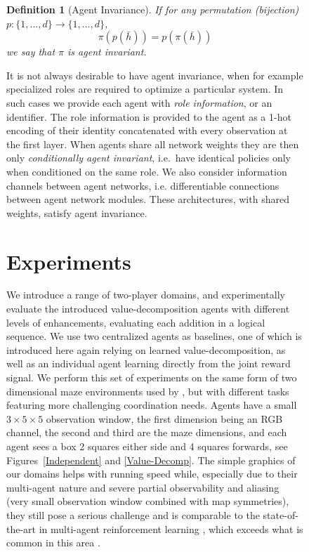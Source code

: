 \documentclass{article}
\newtheorem{definition}{Definition}
\begin{document}
\begin{figure}
\begin{definition}[Agent Invariance]
If for any permutation (bijection) $p:\{1,...,d\}\to\{1,...,d\}$, 
$$\pi(p(\bar{h}))=p(\pi(\bar{h}))$$
we say that $\pi$ is \emph{agent invariant}. 
\end{definition}

It is not always desirable to have agent invariance, when for example specialized roles are required to optimize a particular system. In such cases we provide each agent with \emph{role information}, or an identifier. The role information is provided to the agent as a 1-hot encoding of their identity concatenated with every observation at the first layer. When agents share all network weights they are then only \emph{conditionally agent invariant}, i.e.\ have identical policies only when conditioned on the same role. We also consider information channels between agent networks, i.e. differentiable connections between agent network modules. These architectures, with shared weights, satisfy agent invariance.

 
\section{Experiments} \label{ExperimentSection}
We introduce a range of two-player domains, and experimentally evaluate the introduced value-decomposition agents with different levels of enhancements, evaluating each addition in a logical sequence.  We use two centralized agents as baselines, one of which is introduced here again relying on learned value-decomposition, as well as an individual agent learning directly from the joint reward signal. We perform this set of experiments on the same form of two dimensional maze environments used by \citet{leibo2017}, but with different tasks featuring more challenging coordination needs. Agents have a small $3\times5\times5$ observation window, the first dimension being an RGB channel, the second and third are the maze dimensions, and each agent sees a box 2 squares either side and 4 squares forwards, see Figures~\ref{Independent} and \ref{Value-Decomp}. The simple graphics of our domains helps with running speed while, especially due to their multi-agent nature and severe partial observability and aliasing (very small observation window combined with map symmetries), they still pose a serious challenge and is comparable to the state-of-the-art in multi-agent reinforcement learning \citep{leibo2017}, which exceeds what is common in this area \citep{TuylsW12}.


\end{figure}
\end{document}
